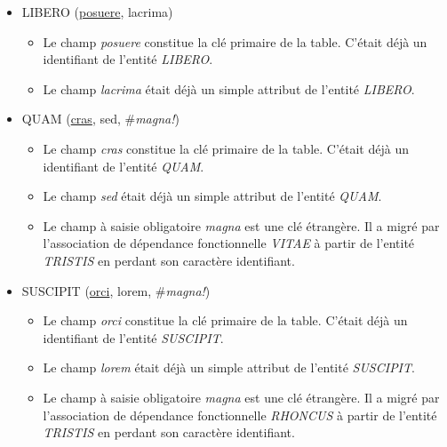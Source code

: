 \documentclass[a4paper]{article}
\newcommand{\relat}[1]{\textsc{#1}}
\newcommand{\attr}[1]{#1}
\newcommand{\prim}[1]{\uline{#1}}
\newcommand{\foreign}[1]{\#\textsl{#1}}
\begin{document}
\begin{itemize}
  \item \relat{LIBERO} (\prim{posuere}, \attr{lacrima})
  \begin{itemize}
    \item Le champ \emph{posuere} constitue la clé primaire de la table. C'était déjà un identifiant de l'entité \emph{LIBERO}.
    \item Le champ \emph{lacrima} était déjà un simple attribut de l'entité \emph{LIBERO}.
  \end{itemize}

  \item \relat{QUAM} (\prim{cras}, \attr{sed}, \foreign{magna!})
  \begin{itemize}
    \item Le champ \emph{cras} constitue la clé primaire de la table. C'était déjà un identifiant de l'entité \emph{QUAM}.
    \item Le champ \emph{sed} était déjà un simple attribut de l'entité \emph{QUAM}.
    \item Le champ à saisie obligatoire \emph{magna} est une clé étrangère. Il a migré par l'association de dépendance fonctionnelle \emph{VITAE} à partir de l'entité \emph{TRISTIS} en perdant son caractère identifiant.
  \end{itemize}

  \item \relat{SUSCIPIT} (\prim{orci}, \attr{lorem}, \foreign{magna!})
  \begin{itemize}
    \item Le champ \emph{orci} constitue la clé primaire de la table. C'était déjà un identifiant de l'entité \emph{SUSCIPIT}.
    \item Le champ \emph{lorem} était déjà un simple attribut de l'entité \emph{SUSCIPIT}.
    \item Le champ à saisie obligatoire \emph{magna} est une clé étrangère. Il a migré par l'association de dépendance fonctionnelle \emph{RHONCUS} à partir de l'entité \emph{TRISTIS} en perdant son caractère identifiant.
  \end{itemize}


\end{itemize}
\end{document}
